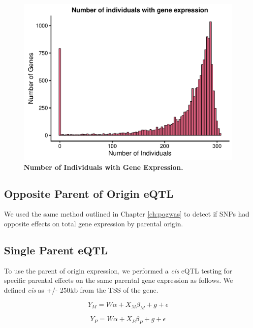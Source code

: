 \begin{figure}[!htb]
\centering \includegraphics[width=5in]{img/ch04/fig-08-individualspergene.pdf}
\caption[Number of Individuals with Gene Expression.]{\textbf{Number of Individuals with Gene Expression.} }
\label{fig:indspergene}
\end{figure}



\subsection{Opposite Parent of Origin eQTL}\label{Opposite Parent of Origin eQTL}
We used the same method outlined in Chapter \ref{ch:pogwas} to detect if SNPs had opposite effects on total gene expression by parental origin. 

\subsection{Single Parent eQTL}\label{Single Parent eQTL}
To use the parent of origin expression, we performed a \emph{cis} eQTL testing for specific parental effects on the same parental gene expression as follows. We defined \emph{cis} as +/- 250kb from the TSS of the gene. 

\begin{equation}
Y _{M}=W\alpha + X_{M}\beta_{M}+g+\epsilon
\end{equation}

\begin{equation}
Y _{P}=W\alpha + X_{P}\beta_{P}+g+\epsilon
\end{equation}



